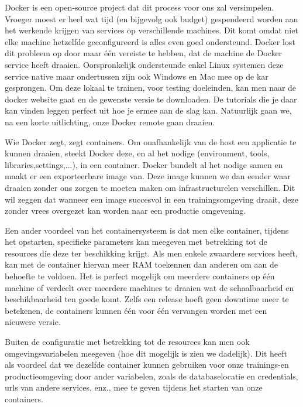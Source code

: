 \documentclass{article}
\begin{document}
	Docker is een open-source project dat dit process voor ons zal versimpelen. Vroeger moest er heel wat tijd (en bijgevolg ook budget) gespendeerd worden aan het werkende krijgen van services op verschillende machines. Dit komt omdat niet elke machine hetzelfde geconfigureerd is alles even goed ondersteund. Docker lost dit probleem op door maar één vereiste te hebben, dat de machine de Docker service heeft draaien. Oorspronkelijk ondersteunde enkel Linux systemen deze service native maar ondertussen zijn ook Windows en Mac mee op de kar gesprongen. Om deze lokaal te trainen, voor testing doeleinden, kan men naar de docker website gaat en de gewenste versie te downloaden. De tutorials die je daar kan vinden leggen perfect uit hoe je ermee aan de slag kan. Natuurlijk gaan we, na een korte uitlichting, onze Docker remote gaan draaien.
	\par
	Wie Docker zegt, zegt containers. Om onafhankelijk van de host een applicatie te kunnen draaien, steekt Docker deze, en al het nodige (environment, tools, libraries,settings,...), in een container. Docker bundelt al het nodige samen en maakt er een exporteerbare image van. Deze image kunnen we dan eender waar draaien zonder ons zorgen te moeten maken om infrastructurelen verschillen. Dit wil zeggen dat wanneer een image succesvol in een trainingsomgeving draait, deze zonder vrees overgezet kan worden naar een productie omgevening.
	\par
	Een ander voordeel van het containersysteem is dat men elke container, tijdens het opstarten, specifieke parameters kan meegeven met betrekking tot de resources die deze ter beschikking krijgt. Als men enkele zwaardere services heeft, kan met de container hiervan meer RAM toekennen dan anderen om aan de behoefte te voldoen. Het is perfect mogelijk om meerdere containers op één machine of verdeelt over meerdere machines te draaien wat de schaalbaarheid en beschikbaarheid ten goede komt. Zelfs een release hoeft geen downtime meer te betekenen, de containers kunnen één voor één vervangen worden met een nieuwere versie.
	\par
	Buiten de configuratie met betrekking tot de resources kan men ook omgevingsvariabelen meegeven (hoe dit mogelijk is zien we dadelijk). Dit heeft als voordeel dat we dezelfde container kunnen gebruiken voor onze trainings-en productieomgeving door ander variabelen, zoals de databaselocatie en credentials, urls van andere services, enz., mee te geven tijdens het starten van onze containers.
\end{document}
